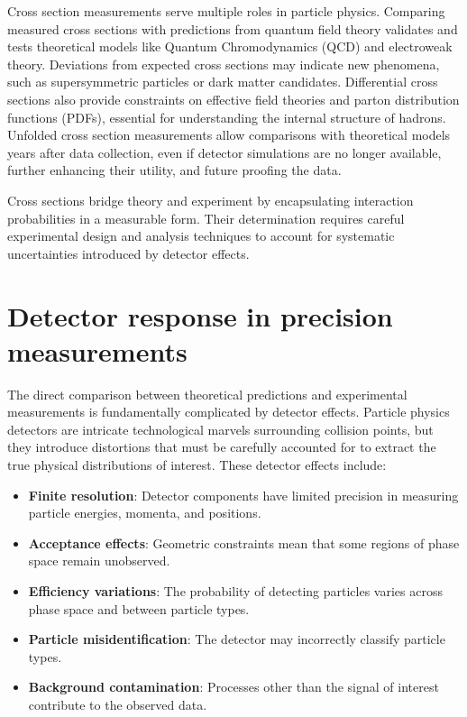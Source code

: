 Cross section measurements serve multiple roles in particle physics.
%
Comparing measured cross sections with predictions from quantum field theory validates and tests theoretical models like Quantum Chromodynamics (QCD) and electroweak theory.
%
Deviations from expected cross sections may indicate new phenomena, such as supersymmetric particles or dark matter candidates.
%
Differential cross sections also provide constraints on effective field theories and parton distribution functions (PDFs), essential for understanding the internal structure of hadrons.
%
Unfolded cross section measurements allow comparisons with theoretical models years after data collection, even if detector simulations are no longer available, further enhancing their utility, and future proofing the data.

Cross sections bridge theory and experiment by encapsulating interaction probabilities in a measurable form.
%
Their determination requires careful experimental design and analysis techniques to account for systematic uncertainties introduced by detector effects.






\section{Detector response in precision measurements}

The direct comparison between theoretical predictions and experimental measurements is fundamentally complicated by detector effects. Particle physics detectors are intricate technological marvels surrounding collision points, but they introduce distortions that must be carefully accounted for to extract the true physical distributions of interest. These detector effects include:

\begin{itemize}
\item \textbf{Finite resolution}: Detector components have limited precision in measuring particle energies, momenta, and positions.
\item \textbf{Acceptance effects}: Geometric constraints mean that some regions of phase space remain unobserved.
\item \textbf{Efficiency variations}: The probability of detecting particles varies across phase space and between particle types.
\item \textbf{Particle misidentification}: The detector may incorrectly classify particle types.
\item \textbf{Background contamination}: Processes other than the signal of interest contribute to the observed data.
\end{itemize}

